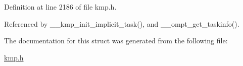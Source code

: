 Definition at line 2186 of file kmp.\-h.



Referenced by \-\_\-\-\_\-kmp\-\_\-init\-\_\-implicit\-\_\-task(), and \-\_\-\-\_\-ompt\-\_\-get\-\_\-taskinfo().



The documentation for this struct was generated from the following file\-:\begin{DoxyCompactItemize}
\item 
\hyperlink{kmp_8h}{kmp.\-h}\end{DoxyCompactItemize}
